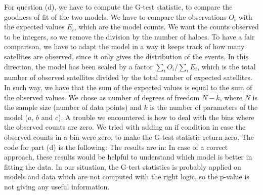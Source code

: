 For question (d), we have to compute the G-test statistic, to compare the goodness of fit of the two models. We have to compare the observations $O_{i}$
with the expected values $E_{i}$, which are the model counts. We want the counts observed to be integers, so we remove the division by the number of haloes.
To have a fair comparison, we have to adapt the model in a way it keeps track of how many satellites are observed, since it only gives the distribution
of the events. In this direction, the model has been scaled by a factor $ \sum_{i} O_{i} / \sum_{i} E_{i} $, which is the total number of observed satellites 
divided by the total number of expected satellites. In such way, we have that the sum of the expected values is equal to the sum of the observed values.
We chose as number of degrees of freedom $N - k$, where $N$ is the sample size (number of data points) and $k$ is the number of parameters of the model ($a$, $b$ and $c$).
A trouble we encountered is how to deal with the bins where the observed counts are zero. We tried with adding an if condition in case
the observed counts in a bin were zero, to make the G-test statistic return zero. 
The code for part (d) is the following: 
The results are in: 
In case of a correct approach, these results would be helpful to understand which model is better in fitting the data. 
In our situation, the G-test statistics is probably applied on models and data which are not computed with the right logic, so the p-value is not giving any useful information.







